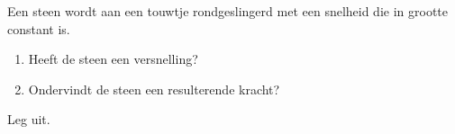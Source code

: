 
\begin{exercise}




 Een steen wordt aan een touwtje rondgeslingerd met een snelheid die in grootte constant is. 

\begin{enumerate}
	\item{}Heeft de steen een versnelling?
	\item{}Ondervindt de steen een resulterende kracht?
\end{enumerate}

Leg uit.

\end{exercise}
